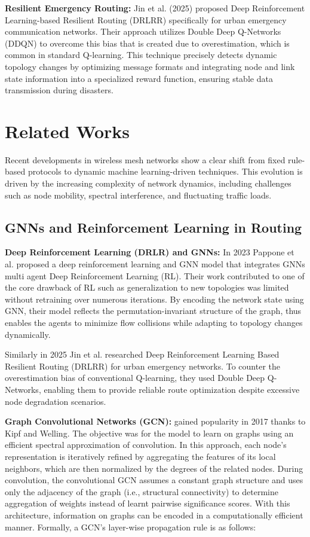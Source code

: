 \documentclass[conference]{IEEEtran}
\begin{document}
\textbf{Resilient Emergency Routing:} Jin et al. (2025) proposed Deep Reinforcement Learning-based Resilient Routing (DRLRR) specifically for urban emergency communication networks. Their approach utilizes Double Deep Q-Networks (DDQN) to overcome this bias that is created due to overestimation, which is common in standard Q-learning. This technique precisely detects dynamic topology changes by optimizing message formats and integrating node and link state information into a specialized reward function, ensuring stable data transmission during disasters.
\section{Related Works}

Recent developments in wireless mesh networks show a clear shift from fixed rule-based protocols to dynamic machine learning-driven techniques. This evolution is driven by the increasing complexity of network dynamics, including challenges such as node mobility, spectral interference, and fluctuating traffic loads.

\subsection{ GNNs and Reinforcement Learning in Routing}

\textbf{Deep Reinforcement Learning (DRLR) and GNNs:} In 2023 Pappone et al. proposed a deep reinforcement learning and GNN model that integrates GNNs multi agent Deep Reinforcement Learning (RL). Their work contributed to one of the core drawback of RL such as generalization to new topologies was limited without retraining over numerous iterations. By encoding the network state using GNN, their model reflects the permutation-invariant structure of the graph, thus enables the agents to minimize flow collisions while adapting to topology changes dynamically.

Similarly in 2025 Jin et al. researched Deep Reinforcement Learning Based Resilient Routing (DRLRR) for urban emergency networks. To counter the overestimation bias of conventional Q-learning, they used Double Deep Q-Networks, enabling them to provide reliable route optimization despite excessive node degradation scenarios.

\textbf{Graph Convolutional Networks (GCN):} gained popularity in 2017 thanks to Kipf and Welling. The objective was for the model to learn on graphs using an efficient spectral approximation of convolution. In this approach, each node's representation is iteratively refined by aggregating the features of its local neighbors, which are then normalized by the degrees of the related nodes. During convolution, the convolutional GCN assumes a constant graph structure and uses only the adjacency of the graph (i.e., structural connectivity) to determine aggregation of weights instead of learnt pairwise significance scores. With this architecture, information on graphs can be encoded in a computationally efficient manner. Formally, a GCN's layer-wise propagation rule is as follows:
\end{document}
